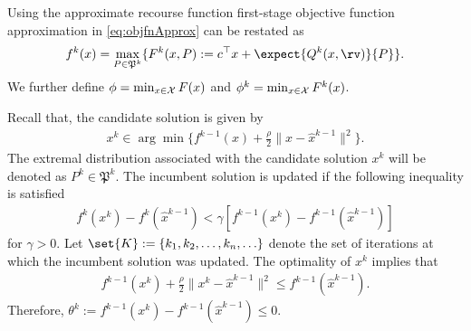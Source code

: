 \documentclass[11pt]{article}
\newcommand{\probset}{\mathfrak{P}}
\newcommand{\frakP}{\mathfrak{P}}
\begin{document}
Using the approximate recourse function first-stage objective function approximation in \eqref{eq:objfnApprox} can be restated as
\begin{align}
    f^k(x) =  \max_{P \in \probset^k} \{F^k(x,P) := c^\top x +\expect{Q^k(x,\rv)}{P}\}.
\end{align}
We further define $\phi = \min_{x \in \cal X} F(x)$ and $\phi^k = \min_{x \in \cal X} F^k(x)$.

Recall that, the candidate solution is given by
\begin{align}
    x^k \in \arg \min \{f^{k-1}(x) + \frac{\rho}{2} \|x-\hat{x}^{k-1}\|^2\}.
\end{align}
The extremal distribution associated with the candidate solution $x^k$ will be denoted as $P^k \in \frakP^k$. The incumbent solution is updated if the following inequality is satisfied
\begin{align} \label{eq:incumbUpdt}
    f^k(x^k) - f^k(\hat{x}^{k-1}) < \gamma [f^{k-1}(x^k) - f^{k-1}(\hat{x}^{k-1})]
\end{align}
for $\gamma > 0$. Let $\set{K} := \{k_1, k_2,\ldots, k_n, \ldots \}$ denote the set of iterations at which the incumbent solution was updated. The optimality of $x^k$ implies that
\begin{align*}
    f^{k-1}(x^k) + \frac{\rho}{2}\|x^k - \hat{x}^{k-1}\|^2 \leq f^{k-1}(\hat{x}^{k-1}).
\end{align*}
Therefore, $\theta^k := f^{k-1}(x^k) - f^{k-1}(\hat{x}^{k-1}) \leq 0$. 
\end{document}
